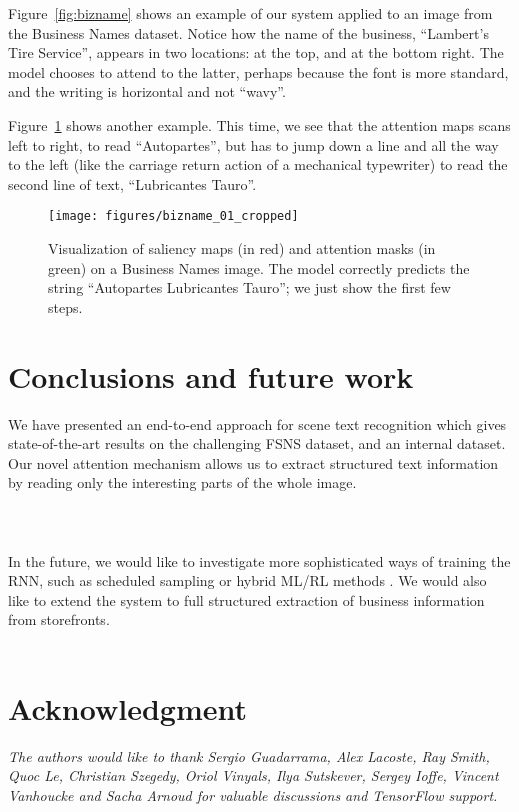 \documentclass[conference]{IEEEtran}
\begin{document}
Figure~\ref{fig:bizname} shows an example of our system applied to
an image from the Business Names dataset. Notice how the name of the
business, ``Lambert's Tire Service'', appears in two locations: at the
top, and at the bottom right. The model chooses to attend to the
latter, perhaps because the font is more standard, and the writing is
horizontal and not ``wavy''. 

Figure~\ref{fig:bizname_heatmap} shows another example.
This time, we see that the attention maps scans left to right,
to read ``Autopartes'',
but has to jump down a line and all the way to the left
(like the carriage return action of a mechanical typewriter)
to read the second line of text, ``Lubricantes Tauro''.


\begin{figure}
\begin{center}
\texttt{[image: figures/bizname\_01\_cropped]}
\caption{Visualization of saliency maps (in red) and attention masks
  (in green) on a Business Names image.
  The model correctly predicts the string ``Autopartes Lubricantes Tauro'';
  we just show the first few steps.
}
\label{fig:bizname_heatmap}
\end{center}
\end{figure}
  \section{Conclusions and future work}

We have presented an end-to-end approach for scene text recognition
which gives state-of-the-art results on the challenging FSNS dataset,
and an internal dataset. Our novel attention mechanism allows us to
extract structured text information by reading only the interesting
parts of the whole image. 
\\ \\ \\ \\
In the future, we would like to investigate more sophisticated ways of
training the RNN, such as scheduled sampling \cite{Bengio2015} or
hybrid ML/RL methods \cite{Norouzi2016}. We would also like to extend
the system to full structured extraction of business information from
storefronts. \\ \\
\section*{Acknowledgment}
\emph{
The authors would like to thank Sergio Guadarrama, Alex Lacoste, Ray Smith, Quoc Le, Christian Szegedy, Oriol Vinyals, Ilya Sutskever, Sergey Ioffe, Vincent Vanhoucke and Sacha Arnoud for valuable discussions and TensorFlow support. 
}
 






\newpage
\end{document}
